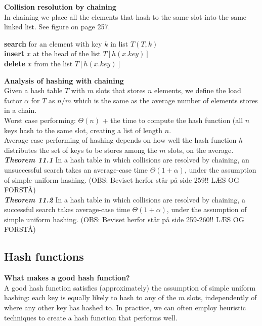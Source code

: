 \documentclass[12pt]{article}
\begin{document}
\textbf{Collision resolution by chaining}\\
In chaining we place all the elements that hash to the same slot into the same linked list. See figure on page 257.

\begin{algorithm}
\begin{algorithmic}[1]
   \State \textbf{search} for an element with key $k$ in list $T(T, k)$\\
   
   \State \textbf{insert} $x$ at the head of the list $T[h(x.key)]$\\

   \State \textbf{delete} $x$ from the list $T[h(x.key)]$
\end{algorithmic}
\end{algorithm}

\textbf{Analysis of hashing with chaining}\\
Given a hash table $T$ with $m$ slots that stores $n$ elements, we define the load factor $\alpha$ for $T$ as $n/m$ which is the same as the average number of elements stores in a chain. \\

Worst case performing: $\Theta (n)$ + the time to compute the hash function (all $n$ keys hash to the same slot, creating a list of length $n$. \\

Average case performing of hashing depends on how well the hash function $h$ distributes the set of keys to be stores among the $m$ slots, on the average. \\

\textbf{\textit{Theorem 11.1}}
In a hash table in which collisions are resolved by chaining, an unsuccessful search takes an average-case time $\Theta (1 + \alpha)$, under the assumption of simple uniform hashing. (OBS: Beviset herfor står på side 259!! LÆS OG FORSTÅ)\\

\textbf{\textit{Theorem 11.2}} 
In a hash table in which collisions are resolved by chaining, a successful search takes average-case time $\Theta (1 + \alpha)$, under the assumption of simple uniform hashing. (OBS: Beviset herfor står på side 259-260!! LÆS OG FORSTÅ)

\subsection{Hash functions}
\textbf{What makes a good hash function?} \\
A good hash function satisfies (approximately) the assumption of simple uniform hashing: each key is equally likely to hash to any of the $m$ slots, independently of where any other key has hashed to. In practice, we can often employ heuristic techniques to create a hash function that performs well. \\
\end{document}
